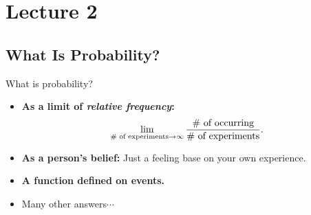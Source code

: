 \section{Lecture 2}

\subsection{What Is Probability?}

\begin{frame}{What is probability?}
	\begin{itemize}
		\item \textbf{As a limit of \textit{relative frequency}:}
		\[\lim_{\# \text{ of experiments}\rightarrow \infty}\frac{\# \text{ of occurring}}{\# \text{ of experiments}}.\]
		\item \textbf{As a person's belief:} Just a feeling base on your own experience.
		\item \textbf{A function defined on events.}
		\item Many other answers$\cdots$
	\end{itemize}
\end{frame}




